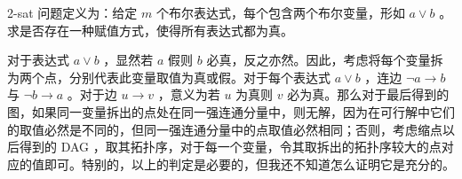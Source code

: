 2-sat 问题定义为：给定 $m$ 个布尔表达式，每个包含两个布尔变量，形如 $a\lor b$ 。求是否存在一种赋值方式，使得所有表达式都为真。

对于表达式 $a\lor b$ ，显然若 $a$ 假则 $b$ 必真，反之亦然。因此，考虑将每个变量拆为两个点，分别代表此变量取值为真或假。对于每个表达式 $a\lor b$ ，连边 $\neg a\to b$ 与 $\neg b\to a$ 。对于边 $u\to v$ ，意义为若 $u$ 为真则 $v$ 必为真。那么对于最后得到的图，如果同一变量拆出的点处在同一强连通分量中，则无解，因为在可行解中它们的取值必然是不同的，但同一强连通分量中的点取值必然相同；否则，考虑缩点以后得到的 DAG ，取其拓扑序，对于每一个变量，令其取拆出的拓扑序较大的点对应的值即可。特别的，以上的判定是必要的，但我还不知道怎么证明它是充分的。